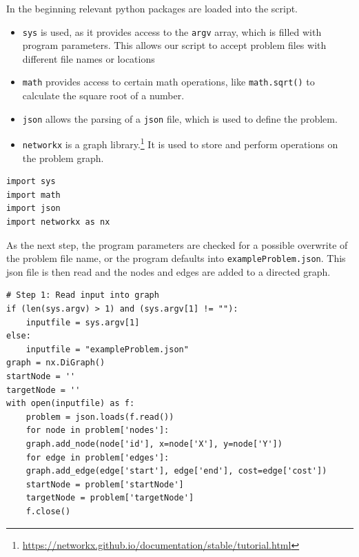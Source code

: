 \documentclass[12pt]{article}
\begin{document}
In the beginning relevant python packages are loaded into the script.
\begin{itemize}
	\item \texttt{sys} is used, as it provides access to the \texttt{argv} array, which is filled with program parameters. This allows our script to accept problem files with different file names or locations
	\item \texttt{math} provides access to certain math operations, like \texttt{math.sqrt()} to calculate the square root of a number.
	\item \texttt{json} allows the parsing of a \texttt{json} file, which is used to define the problem.
	\item \texttt{networkx} is a graph library.\footnote{\url{https://networkx.github.io/documentation/stable/tutorial.html}} It is used to store and perform operations on the problem graph.
\end{itemize}
\begin{lstlisting}
import sys
import math
import json
import networkx as nx
\end{lstlisting}

As the next step, the program parameters are checked for a possible overwrite of the problem file name, or the program defaults into \texttt{exampleProblem.json}.
This json file is then read and the nodes and edges are added to a directed graph.

\begin{lstlisting}
# Step 1: Read input into graph
if (len(sys.argv) > 1) and (sys.argv[1] != ""):
	inputfile = sys.argv[1]
else:
	inputfile = "exampleProblem.json"
graph = nx.DiGraph()
startNode = ''
targetNode = ''
with open(inputfile) as f:
	problem = json.loads(f.read())
	for node in problem['nodes']:
	graph.add_node(node['id'], x=node['X'], y=node['Y'])
	for edge in problem['edges']:
	graph.add_edge(edge['start'], edge['end'], cost=edge['cost'])
	startNode = problem['startNode']
	targetNode = problem['targetNode']
	f.close()
\end{lstlisting}
\end{document}
